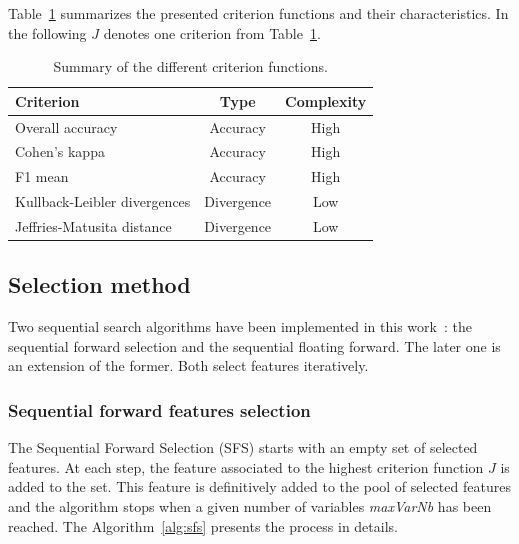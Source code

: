 \documentclass[journal,peerreview,onecolumn]{IEEEtran}
\begin{document}
        Table~\ref{tab:crit} summarizes the presented criterion functions and their characteristics. In the following $J$ denotes one criterion from Table~\ref{tab:crit}.

        \begin{table}[!t]
            \centering
            \caption{Summary of the different criterion functions.\label{tab:crit}}
            \begin{tabular}[b]{lcc}
              \toprule
              Criterion & Type & Complexity \\
              \midrule
              Overall accuracy            & Accuracy   & High \\
              Cohen's kappa               & Accuracy   & High\\
              F1 mean                     & Accuracy   & High\\
              \midrule
              Kullback-Leibler divergences & Divergence & Low \\
              Jeffries-Matusita distance  & Divergence & Low \\
              \bottomrule
            \end{tabular}
        \end{table}

        \subsection{Selection method}
        \label{sec:selection:method}
        Two  sequential  search  algorithms have been  implemented  in  this
        work~\cite{Guyon:2006:FEF:1208773}:  the   sequential  forward
        selection and the sequential  floating forward.  The later one
        is  an   extension  of   the  former.  Both   select  features
        iteratively.

        \subsubsection{Sequential forward features selection}
        \label{sec:forward-presentation}

        The Sequential Forward Selection (SFS) starts with an empty set of selected features.  At each  step, the feature associated to the highest criterion function $J$  is added  to the set. This feature is definitively added to the pool of selected features and the algorithm stops when a given number of variables \emph{maxVarNb} has been reached. The Algorithm~\ref{alg:sfs} presents the process in details.
\end{document}

